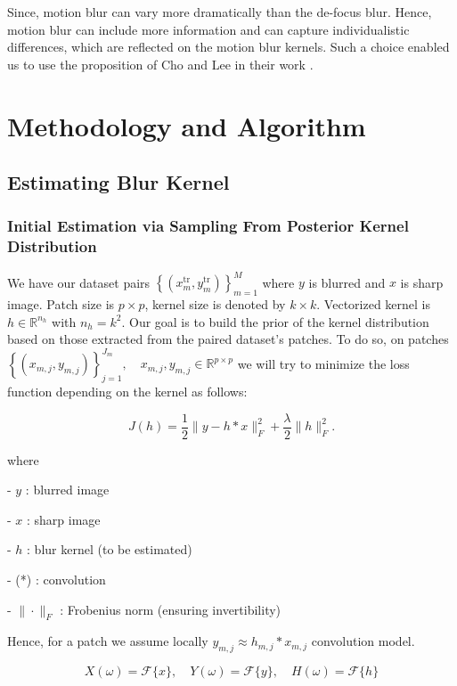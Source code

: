 \documentclass{article}
\theoremstyle{definition}
\begin{document}
Since, motion blur can vary more dramatically than the de-focus blur. Hence, motion blur can include more information and can capture individualistic differences, which are reflected on the motion blur kernels.
Such a choice enabled us to use the proposition of Cho and Lee in their work  \cite{cho-fast}.




\section{Methodology and Algorithm}





\subsection{Estimating Blur Kernel}

\subsubsection{Initial Estimation via Sampling From Posterior Kernel Distribution}

We have our dataset pairs $\left\{\left(x_m^{\operatorname{tr}}, y_m^{\operatorname{tr}}\right)\right\}_{m=1}^M$ where $y$ is blurred and $x$ is sharp image. Patch size is  $p \times p$, kernel size is denoted by $k \times k$. Vectorized kernel is $h \in \mathbb{R}^{n_h}$ with $n_h=k^2$. Our goal is to build the prior of the kernel distribution based on those extracted from the paired dataset's patches. To do so, on  patches $\left\{\left(x_{m, j}, y_{m, j}\right)\right\}_{j=1}^{J_m}, \quad x_{m, j}, y_{m, j} \in \mathbb{R}^{p \times p}$ we will try to minimize the loss function depending on the kernel as follows:

$$
J(h)=\frac{1}{2}\|y-h * x\|_F^2+\frac{\lambda}{2}\|h\|_F^2 .
$$


where 

- $y$ : blurred image

- $x$ : sharp image

- $h$ : blur kernel (to be estimated)

- (*) :  convolution

- $\|\cdot\|_F$ : Frobenius norm (ensuring invertibility)

Hence, for a patch we assume locally $y_{m, j} \approx h_{m, j} * x_{m, j}$ convolution model. 

$$
X(\omega)=\mathcal{F}\{x\}, \quad Y(\omega)=\mathcal{F}\{y\}, \quad H(\omega)=\mathcal{F}\{h\}
$$
\end{document}
